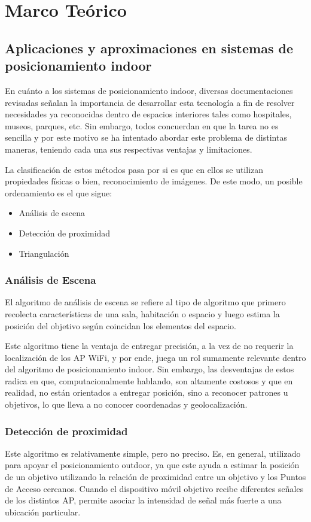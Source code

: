 \chapter{Marco Teórico}

\section{Aplicaciones y aproximaciones en sistemas de posicionamiento indoor}

En cuánto a los sistemas de posicionamiento indoor, diversas documentaciones revisadas señalan la importancia de desarrollar esta tecnología a fin de resolver necesidades ya reconocidas dentro de espacios interiores tales como hospitales, museos, parques, etc. Sin embargo, todos concuerdan en que la tarea no es sencilla y por este motivo se ha intentado abordar este problema de distintas maneras, teniendo cada una sus respectivas ventajas y limitaciones.

La clasificación de estos métodos pasa por si es que en ellos se utilizan propiedades físicas o bien, reconocimiento de imágenes. De este modo, un posible ordenamiento es el que sigue:

\begin{itemize}
    \item{Análisis de escena}
    \item {Detección de proximidad}
    \item{Triangulación}
\end{itemize}

\subsection{Análisis de Escena}
El algoritmo de análisis de escena se refiere al tipo de algoritmo que primero recolecta características de una sala, habitación o espacio y luego estima la posición del objetivo según coincidan los elementos del espacio.

Este algoritmo tiene la ventaja de entregar precisión, a la vez de no requerir la localización de los AP WiFi, y por ende, juega un rol sumamente relevante dentro del algoritmo de posicionamiento indoor. Sin embargo, las desventajas de estos radica en que, computacionalmente hablando, son altamente costosos y que en realidad, no están orientados a entregar posición, sino a reconocer patrones u objetivos, lo que lleva a no conocer coordenadas y geolocalización.

\subsection{Detección de proximidad}\label{Detección de Proximidad}
Este algoritmo es relativamente simple, pero no preciso. Es, en general, utilizado para apoyar el posicionamiento outdoor, ya que este ayuda a estimar la posición de un objetivo utilizando la relación de proximidad entre un objetivo y los Puntos de Acceso cercanos. Cuando el dispositivo móvil objetivo recibe diferentes señales de los distintos AP, permite asociar la intensidad de señal más fuerte a una ubicación particular. 

